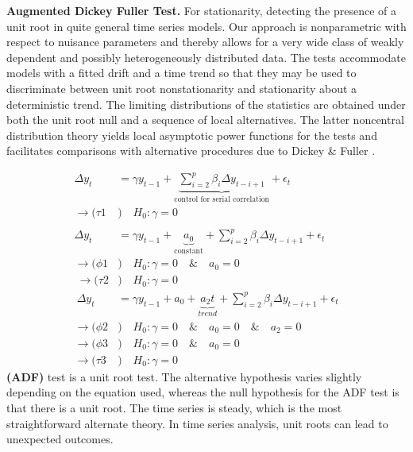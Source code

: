 \textbf{Augmented Dickey Fuller Test.} For stationarity, detecting the presence of a unit root in quite general time series models. Our approach is nonparametric with respect to nuisance parameters and thereby allows for a very wide class of weakly dependent and possibly heterogeneously distributed data. The tests accommodate models with a fitted drift and a time trend so that they may be used to discriminate between unit root nonstationarity and stationarity about a deterministic trend. The limiting distributions of the statistics are obtained under both the unit root null and a sequence of local alternatives. The latter noncentral distribution theory yields local asymptotic power functions for the tests and facilitates comparisons with alternative procedures due to Dickey \& Fuller \parencite{phillips1988testing}.

\begin{align}        \Delta y_t &=  \gamma y_{t-1} + \underbrace{\sum_{i=2}^{p} \beta_i \Delta y_{t-i+1}}_\text{control for serial correlation} + \epsilon_t  \\ \rightarrow (\tau1&)\quad H_0 :  {\gamma = 0} \\\\       \Delta y_t &=  {\gamma} y_{t-1}  + \underbrace{{a_0}}_\text{constant} + \sum_{i=2}^{p} \beta_i \Delta y_{t-i+1} + \epsilon_t   \\ \rightarrow (\phi1&)\quad H_0 :  {\gamma = 0} \quad\&\quad{a_0 = 0}  \\\ \rightarrow (\tau2&)\quad H_0 :  {\gamma = 0}  \\\       \Delta y_t &=  {\gamma} y_{t-1}  + {a_0}  + \underbrace{{a_2} t}_{trend} + \sum_{i=2}^{p} \beta_i \Delta y_{t-i+1}  + \epsilon_t \\ \rightarrow (\phi2&)\quad H_0 :  {\gamma = 0} \quad\&\quad {a_0 = 0} \quad\&\quad {a_2 = 0} \\ \rightarrow (\phi3&)\quad H_0 :  {\gamma = 0} \quad\&\quad{a_0 = 0}  \\ \rightarrow (\tau3&)\quad H_0 :  {\gamma = 0}    
 \end{align}
 \textbf{(ADF)} test is a unit root test. The alternative hypothesis varies slightly depending on the equation used, whereas the null hypothesis for the ADF test is that there is a unit root. The time series is steady, which is the most straightforward alternate theory. In time series analysis, unit roots can lead to unexpected outcomes.\\

